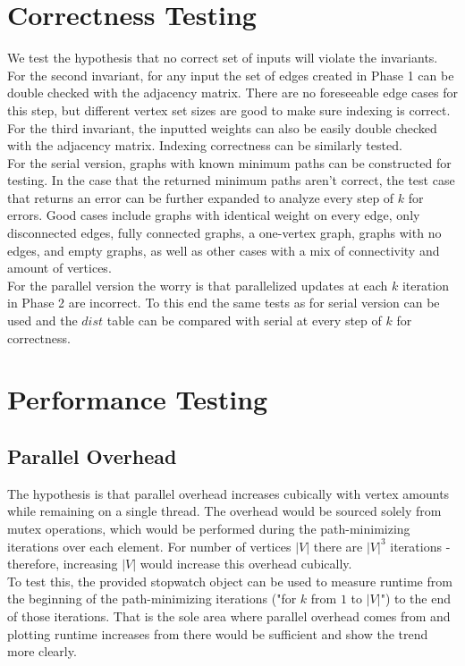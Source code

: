 \documentclass{article}
\begin{document}
\begin{adjustwidth}{-2cm}{-2cm}
\section{Correctness Testing}
We test the hypothesis that no correct set of inputs will violate the invariants.\\
For the second invariant, for any input the set of edges created in Phase 1 can be double checked with the adjacency matrix. There are no foreseeable edge cases for this step, but different vertex set sizes are good to make sure indexing is correct.\\
For the third invariant, the inputted weights can also be easily double checked with the adjacency matrix. Indexing correctness can be similarly tested.\\
For the serial version, graphs with known minimum paths can be constructed for testing. In the case that the returned minimum paths aren't correct, the test case that returns an error can be further expanded to analyze every step of $k$ for errors. Good cases include graphs with identical weight on every edge, only disconnected edges, fully connected graphs, a one-vertex graph, graphs with no edges, and empty graphs, as well as other cases with a mix of connectivity and amount of vertices.\\
For the parallel version the worry is that parallelized updates at each $k$ iteration in Phase 2 are incorrect. To this end the same tests as for serial version can be used and the $dist$ table can be compared with serial at every step of $k$ for correctness.

\section{Performance Testing}
\subsection{Parallel Overhead}
The hypothesis is that parallel overhead increases cubically with vertex amounts while remaining on a single thread. The overhead would be sourced solely from mutex operations, which would be performed during the path-minimizing iterations over each element. For number of vertices $\vert V \vert$ there are $\vert V \vert^{3}$ iterations - therefore, increasing $\vert V \vert$ would increase this overhead cubically.\\
To test this, the provided stopwatch object can be used to measure runtime from the beginning of the path-minimizing iterations ("for $k$ from $1$ to $\vert V \vert$") to the end of those iterations. That is the sole area where parallel overhead comes from and plotting runtime increases from there would be sufficient and show the trend more clearly.

\end{adjustwidth}
\end{document}
